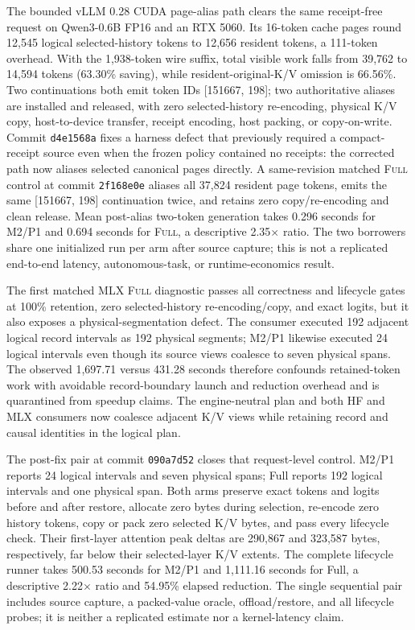 \documentclass[11pt]{article}
\begin{document}
The bounded vLLM 0.28 CUDA page-alias path clears the same receipt-free request
on Qwen3-0.6B FP16 and an RTX 5060.  Its 16-token cache pages round 12,545
logical selected-history tokens to 12,656 resident tokens, a 111-token
overhead.  With the 1,938-token wire suffix, total visible work falls from
39,762 to 14,594 tokens (63.30\% saving), while resident-original-K/V omission
is 66.56\%.  Two continuations both emit token IDs [151667, 198]; two
authoritative aliases are installed and released, with zero selected-history
re-encoding, physical K/V copy, host-to-device transfer, receipt encoding,
host packing, or copy-on-write.  Commit \texttt{d4e1568a} fixes a harness defect
that previously required a compact-receipt source even when the frozen policy
contained no receipts: the corrected path now aliases selected canonical pages
directly.  A same-revision matched \textsc{Full} control at commit
\texttt{2f168e0e} aliases all 37,824 resident page tokens, emits the same
[151667, 198] continuation twice, and retains zero copy/re-encoding and clean
release.  Mean post-alias two-token generation takes 0.296 seconds for M2/P1
and 0.694 seconds for \textsc{Full}, a descriptive 2.35$\times$ ratio.  The two
borrowers share one initialized run per arm after source capture; this is not a
replicated end-to-end latency, autonomous-task, or runtime-economics result.

The first matched MLX \textsc{Full} diagnostic passes all correctness and
lifecycle gates at 100\% retention, zero selected-history re-encoding/copy,
and exact logits, but it also exposes a physical-segmentation defect.  The
consumer executed 192 adjacent logical record intervals as 192 physical
segments; M2/P1 likewise executed 24 logical intervals even though its source
views coalesce to seven physical spans.  The observed 1,697.71 versus 431.28
seconds therefore confounds retained-token work with avoidable record-boundary
launch and reduction overhead and is quarantined from speedup claims.  The
engine-neutral plan and both HF and MLX consumers now coalesce adjacent K/V
views while retaining record and causal identities in the logical plan.

The post-fix pair at commit \texttt{090a7d52} closes that request-level
control.  M2/P1 reports 24 logical intervals and seven physical spans; Full
reports 192 logical intervals and one physical span.  Both arms preserve exact
tokens and logits before and after restore, allocate zero bytes during
selection, re-encode zero history tokens, copy or pack zero selected K/V bytes,
and pass every lifecycle check.  Their first-layer attention peak deltas are
290,867 and 323,587 bytes, respectively, far below their selected-layer K/V
extents.  The complete lifecycle runner takes 500.53 seconds for M2/P1 and
1,111.16 seconds for Full, a descriptive 2.22$\times$ ratio and 54.95\%
elapsed reduction.  The single sequential pair includes source capture, a
packed-value oracle, offload/restore, and all lifecycle probes; it is neither a
replicated estimate nor a kernel-latency claim.
\end{document}
